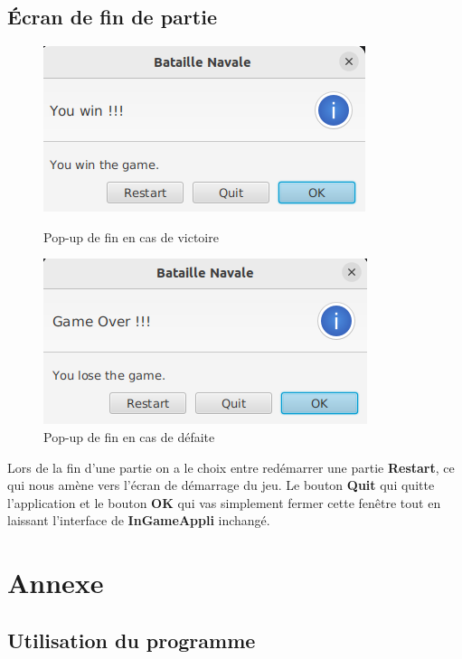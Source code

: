 \documentclass[12pt]{article}
\begin{document}
\subsection{Écran de fin de partie}
\begin{figure}[H]
      \includegraphics[width=\linewidth]{images/image BN V2/WinGame.png}
      \caption{Pop-up de fin en cas de victoire}
      \endminipage\hfill
      \includegraphics[width=\linewidth]{images/image BN V2/LoseGame.png}
      \caption{Pop-up de fin en cas de défaite}
      \endminipage\hfill
\end{figure}
Lors de la fin d'une partie on a le choix entre redémarrer une partie
\textbf{Restart}, ce qui nous amène vers l'écran de démarrage du jeu. Le bouton
\textbf{Quit} qui quitte l'application et le bouton \textbf{OK} qui
vas simplement fermer cette fenêtre tout en laissant l'interface de
\textbf{InGameAppli} inchangé.

\bigskip

\section{Annexe}
\subsection{Utilisation du programme}
\end{document}
